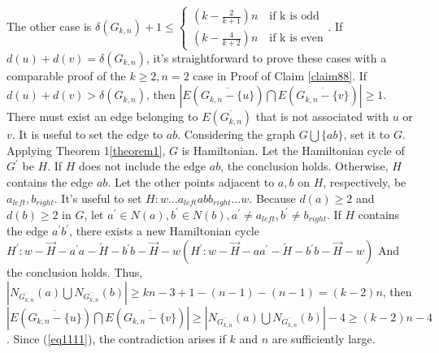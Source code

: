 \documentclass[reqno]{amsart}
\begin{document}
The other case is $\delta(G_{k,n}) + 1 \leq \left\{\begin{array}{l}\left(k-\frac{2}{k+1}\right) n \quad \text{if k is odd}\\ \left(k-\frac{4}{k+2}\right) n \quad \text{if k is even}\end{array}\right.$. If $d(u)+d(v)=\delta(G_{k,n})$, it’s straightforward to prove these cases with a comparable proof of the  $k \geq 2,n=2$ case in Proof of Claim \ref{claim88}. If $d(u)+d(v) > \delta(G_{k,n})$, then $|E(\overline{G_{k,n} - \{u\}}) \bigcap E(\overline{G_{k,n} - \{v\}})| \geq 1$. There must exist an edge belonging to $E(\overline{G_{k,n}})$ that is not associated with $u$ or $v$. It is useful to set the edge to $ab$. Considering the graph $G \bigcup\{a b\}$, set it to $G$. Applying Theorem 1\ref{theorem1}, $G$ is Hamiltonian. Let the Hamiltonian cycle of $G^{\prime}$ be $H$. If $H$ does not include the edge $ab$, the conclusion holds. Otherwise, $H$ contains the edge $ab$. Let the other points adjacent to $a,b$ on $H$, respectively, be $a_{left},b_{right}$. It’s useful to set $H: w \ldots a_{l e f t} a b b_{r i g h t} \ldots w$. Because $d(a) \geq 2$ and $d(b) \geq 2$ in $G$, let $a^{\prime} \in N(a), b^{\prime} \in N(b), a^{\prime} \neq a_{l e f t}, b^{\prime} \neq b_{r i g h t}$. If $H$ contains the edge $a^{\prime}b^{\prime}$, there exists a new Hamiltonian cycle $H^{\prime}: w-\overrightarrow{H}-a^{\prime} a-\overleftarrow{H}-b^{\prime} b-\overrightarrow{H}-w\left(H^{\prime}: w-\overrightarrow{H}-a a^{\prime}-\overleftarrow{H}-b^{\prime} b-\overrightarrow{H}-w\right)$
And the conclusion holds. Thus, $|N_{\overline{G_{k,n}}}(a) \bigcup N_{\overline{G_{k,n}}}(b)| \geq k n-3+1-(n-1)-(n-1)=(k-2) n$, then $|E(\overline{G_{k,n} - \{u\}}) \bigcap E(\overline{G_{k,n} - \{v\}})| \geq |N_{\overline{G_{k,n}}}(a) \bigcup N_{\overline{G_{k,n}}}(b)| -4 \geq(k-2) n-4$. Since (\ref{eq1111}), the contradiction arises if $k$ and $n$ are sufficiently large.




\end{document}

